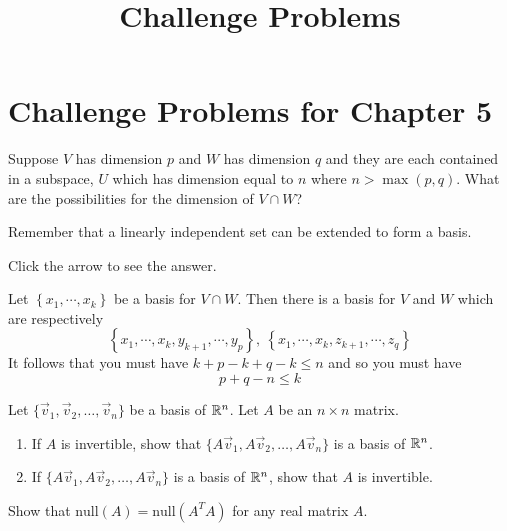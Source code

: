 \documentclass{ximera}
\title{Challenge Problems} \license{CC BY-NC-SA 4.0}
\begin{document}
\begin{abstract}
\end{abstract}
\maketitle

\section*{Challenge Problems for Chapter 5}

\begin{problem}\label{prb:5.29} Suppose $V$ has dimension $p$ and $W$ has dimension $q$ and they
are each contained in a subspace, $U$ which has dimension equal to $n$ where
$n>\max \left( p,q\right).$ What are the possibilities for the dimension of
$V\cap W$? 

\begin{hint}
Remember that a linearly independent set can be extended to form a basis.
\end{hint}

Click the arrow to see the answer.
\begin{expandable}
Let $\left\{ x_{1},\cdots ,x_{k}\right\} $ be a
basis for $V\cap W.$ Then there is a basis for $V$ and $W$ which are
respectively
\[
\left\{ x_{1},\cdots ,x_{k},y_{k+1},\cdots ,y_{p}\right\} ,\ \left\{
x_{1},\cdots ,x_{k},z_{k+1},\cdots ,z_{q}\right\}
\]
It follows that you must have $k+p-k+q-k\leq n$ and so you must have
\[
p+q-n\leq k
\]
\end{expandable}
\end{problem}

\begin{problem}\label{prob:nich6.2}
    Let $\{\vec{v}_1, \vec{v}_2, \dots, \vec{v}_n\}$ be a basis of $\mathbb{R}^n$.  Let $A$ be an $n\times n$ matrix.
    \begin{enumerate}
        \item If $A$ is invertible, show that $\{A\vec{v}_1, A\vec{v}_2, \dots, A\vec{v}_n\}$ is a basis of $\mathbb{R}^n$.
        \item If $\{A\vec{v}_1, A\vec{v}_2, \dots, A\vec{v}_n\}$ is a basis of $\mathbb{R}^n$, show that $A$ is invertible.
    \end{enumerate}
\end{problem}

\begin{problem}\label{prob:nich6.4}
    Show that $\text{null}(A)=\text{null}(A^TA)$ for any real matrix $A$. 
\end{problem}
\end{document}
